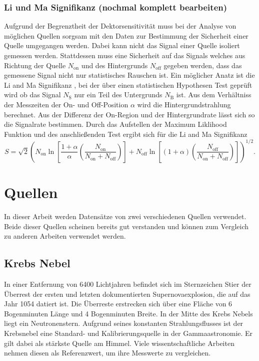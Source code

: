 \subsection*{Li und Ma Signifikanz (nochmal komplett bearbeiten)}
Aufgrund der Begrenztheit der Dektorsensitivität muss bei der Analyse von möglichen Quellen sorgsam mit den Daten zur Bestimmung der Sicherheit einer Quelle umgegangen werden.
Dabei kann nicht das Signal einer Quelle isoliert gemessen werden. 
Stattdessen muss eine Sicherheit auf das Signals welches aus Richtung der Quelle $N_\text{on}$ und des Hintergrunds $N_\text{off}$ gegeben werden, dass das gemessene Signal nicht nur statistisches Rauschen ist.
Ein möglicher Anatz ist die Li and Ma Signifikanz \cite{liandma}, bei der über einen statistischen Hypothesen Test geprüft wird ob das Signal $N_\text{S}$ nur ein Teil des Untergrunds $N_\text{B}$ ist. 
Aus dem Verhältniss der Messzeiten der On- und Off-Position $\alpha$ wird die Hintergrundstrahlung berechnet. 
Aus der Differenz der On-Region und der Hintergrundrate lässt sich so die Signalrate bestimmen. 
Durch das Aufstellen der Maximum Liklihood Funktion und des anschließenden Test ergibt sich für die Li and Ma Signifikanz
\begin{equation}
S = \sqrt{2} \left( N_\text{on} \ln \left[ \frac{1+ \alpha}{\alpha}\left( \frac{N_\text{on}}{N_\text{on} + N_\text{off}} \right) \right] + N_\text{off} \ln \left[ \left( 1+ \alpha \right) \left( \frac{N_\text{off}}{N_\text{on} + N_\text{off}} \right) \right] \right)^{1/2}.
\end{equation}

\chapter{Quellen}
In dieser Arbeit werden Datensätze von zwei verschiedenen Quellen verwendet. 
Beide dieser Quellen scheinen bereits gut verstanden und können zum Vergleich zu anderen Arbeiten verwendet werden.
\section{Krebs Nebel}
In einer Entfernung von 6400 Lichtjahren befindet sich im Sternzeichen Stier der Überrest der ersten und letzten dokumentierten Supernovaexplosion, die auf das Jahr 1054 datiert ist. 
Die Überreste erstrecken sich über eine Fläche von 6 Bogenminuten Länge und 4 Bogenminuten Breite. 
In der Mitte des Krebs Nebels liegt ein Neutronenstern.
Aufgrund seines konstanten Strahlungsflusses ist der Krebsnebel eine Standard- und Kalibrierungsquelle in der Gammaastronomie.
Er gilt dabei als stärkste Quelle am Himmel. 
Viele wissentschaftliche Arbeiten nehmen diesen als Referenzwert, um ihre Messwerte zu vergleichen. 


